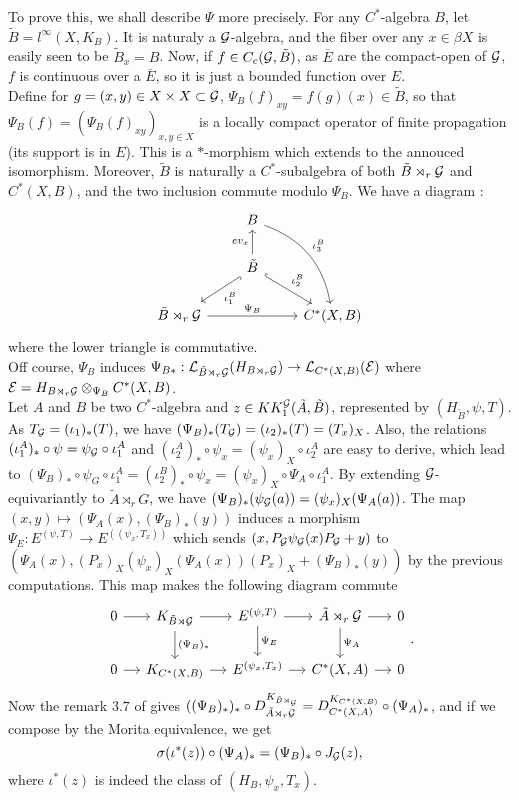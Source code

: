 To prove this, we shall describe $\Psi$ more precisely. For any $C^*$-algebra $B$, let $\tilde B = l^\infty (X,K_B)$. It is naturaly a $\mathcal G$-algebra, and the fiber over any $x\in\beta X$ is easily seen to be $\tilde B_x = B$. Now, if $f\in C_c(\mathcal G, \tilde B)$, as $\overline E$ are the compact-open of $\mathcal G$, $f$ is continuous over a $\overline E$, so it is just a bounded function over $E$.\\
Define for $g=(x,y)\in X\times X\subset \mathcal G$,
$\Psi_B(f)_{xy}=f(g)(x)\in \tilde B$,
so that $\Psi_B(f)=(\Psi_B(f)_{xy})_{x,y\in X}$ is a locally compact operator of finite propagation (its support is in $E$). This is a $*$-morphism which extends to the annouced isomorphism. Moreover, $\tilde B$ is naturally a $C^*$-subalgebra of both $\tilde B\rtimes_r \mathcal G$ and $C^*(X,B)$, and the two inclusion commute modulo $\Psi_B$. We have a diagram :
\[\begin{tikzcd} 
  \  & B \arrow[bend left]{rdd}{\iota_3^B}& \\
  \ &\tilde B \arrow{u}{ev_x}\arrow[hookrightarrow]{ld}{\iota_1^B}\arrow[hookrightarrow]{rd}{\iota_2^B} &  \\ 
\tilde B\rtimes_r\G \arrow{rr}{\Psi_B} &  &  C^*(X,B) 
\end{tikzcd}\] 
where the lower triangle is commutative.\\

Off course, $\Psi_B$ induces $\Psi_{B*} : \mathcal L_{\tilde B\rtimes_r \mathcal G}(H_{B\rtimes_r \mathcal G})\rightarrow \mathcal L_{C^*(X,B)}(\mathcal E)$ where $\mathcal E = H_{B\rtimes_r \mathcal G}\otimes_{\Psi_B} C^*(X,B)$. \\
Let $A$ and $B$ be two $C^*$-algebra and $z\in KK_1^\mathcal G(\tilde A,\tilde B)$, represented by $(H_{\tilde B}, \psi, T)$. As $T_\mathcal G = (\iota_1)_*(T)$, we have $(\Psi_B)_*(T_\mathcal G)=(\iota_2)_*(T)=(T_x)_X$. Also, the relations $(\iota_1^A)_*\circ\psi = \psi_\mathcal G\circ \iota_1^A$ and $(\iota_2^A)_*\circ\psi_x = (\psi_x)_X\circ \iota_2^A$ are easy to derive, which lead to $(\Psi_B)_*\circ \psi_G \circ \iota_1^A= (\iota_2^B)_*\circ \psi_x = (\psi_x)_X\circ \Psi_A\circ \iota_1^A$. By extending $\mathcal G$-equivariantly to $\tilde A  \rtimes_r G$, we have $(\Psi_B)_*(\psi_\mathcal G(a))=(\psi_x)_X(\Psi_A(a))$. The map $(x,y)\mapsto (\Psi_A(x), (\Psi_B)_*(y))$ induces a morphism $\Psi_E : E^{(\psi,T)}  \rightarrow  E^{((\psi_x,T_x))}$ which sends 
$(x,P_\mathcal G \psi_\mathcal G(x)P_\mathcal G + y)$ to $(\Psi_A(x), (P_x)_X(\psi_x)_X(\Psi_A(x))(P_x)_X+(\Psi_B)_*(y))$ by the previous computations. This map makes the following diagram commute
\[
\begin{tikzcd}[column sep = small]
0\arrow{r} & K_{\tilde B\rtimes \G}\arrow{r}\arrow{d}{(\Psi_B)_*} & E^{(\psi,T)} \arrow{r}\arrow{d}{\Psi_E}& \tilde A\rtimes_r \G\arrow{r}\arrow{d}{\Psi_A} & 0\\
0\arrow{r} & K_{C^*(X,B)}\arrow{r} & E^{(\psi_x,T_x)} \arrow{r}& C^*(X,A)\arrow{r} & 0
\end{tikzcd}.
\]
Now the remark $3.7$ of \cite{OY2} gives $((\Psi_B)_*)_*\circ D_{\tilde A\rtimes_r\mathcal G}^{K_{\tilde B\rtimes_\mathcal G}} = D_{C^*(X,A)}^{K_{C^*(X,B)}}\circ (\Psi_A)_*$, and if we compose by the Morita equivalence, we get 
\[\sigma(\iota^*(z)) \circ (\Psi_A)_* = (\Psi_B)_*\circ J_\mathcal G(z),\]
where $\iota^*(z)$ is indeed the class of $(H_B, \psi_x,T_x)$.\\

